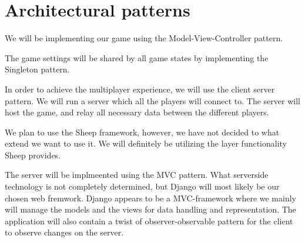 \section{Architectural patterns} 
\label{architecturalpatterns}

We will be implementing our game using the Model-View-Controller pattern. 

The game settings will be shared by all game states by implementing the Singleton pattern. 

In order to achieve the multiplayer experience, we will use the client server pattern. We will run a server which all the players will connect to. The server will host the game, and relay all necessary data between the different players. 

We plan to use the Sheep framework, however, we have not decided to what extend we want to use it. We will definitely be utilizing the layer functionality Sheep provides.

The server will be implmeented using the MVC pattern. What serverside technology is not completely determined, but Django will most likely be our chosen web fremwork. Django appears to be a MVC-framework where we mainly will manage the models and the views for data handling and representation. The application will also contain a twist of observer-observable pattern for the client to observe changes on the server. 